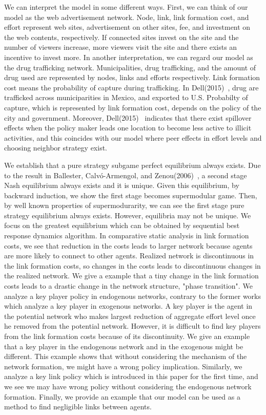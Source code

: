 \documentclass[12pt]{article}
\theoremstyle{definition}
\begin{document}
We can interpret the model in some different ways.
First, we can think of our model as the web advertisement network.
Node, link, link formation cost, and effort represent web sites, advertisement on other sites, fee, and investment on the web contents, respectively.
If connected sites invest on the site and the number of viewers increase, more viewers visit the site and there exists an incentive to invest more.
In another interpretation, we can regard our model as the drug trafficking network.
Municipalities, drug trafficking, and the amount of drug used are represented by nodes, links and efforts respectively.
Link formation cost means the probability of capture during trafficking.
In Dell(2015)~\cite{Dell}, drug are trafficked across municiparities in Mexico, and exported to U.S.
Probabilty of capture, which is represented by  link formation cost, depends on the policy of the city and government.
Moreover, Dell(2015)~\cite{Dell} indicates that there exist spillover effects when the policy maker leads one location to become less active to illicit activities, and this coincides with our model where peer effects in effort levels and choosing neighbor strategy exist.

We establish that a pure strategy subgame perfect equilibrium always exists.
Due to the result in Ballester, Calv\'{o}-Armengol, and Zenou(2006)~\cite{whowho}, a second stage Nash equilibrium always exists and it is unique.
Given this equilibrium, by backward induction, we show the first stage becomes supermodular game.
Then, by well known properties of supermodurarity, we can see the first stage pure strategy equilibrium always exists.
However, equilibria may not be unique.
We focus on the greatest equilibrium which can be obtained by sequential best response dynamics algorithm.
In comparative static analysis in link formation costs, we see that reduction in the costs leads to larger network because agents are more likely to connect to other agents.
Realized network is discontinuous in the link formation costs, so changes in the costs leads to discontinuous changes in the realized network.
We give a example that a tiny change in the link formation costs leads to a drastic change in the network structure, "phase transition".
We analyze a key player policy in endogenous networks, contrary to the former works which analyze a key player in exogenous networks.
A key player is the agent in the potential network who makes largest reduction of aggregate effort level once he removed from the potential network.
However, it is difficult to find key players from the link formation costs because of its discontinuity.
We give an example that a key player in the endogenous network and in the exogenous might be different.
This example shows that without considering the mechanism of the network formation, we might have a wrong policy implication.
Similarly, we analyze a key link policy which is introduced in this paper for the first time, and we see we may have wrong policy without considering the endogenous network formation.
Finally, we provide an example that our model can be used as a method to find negligible links between agents.
\end{document}
